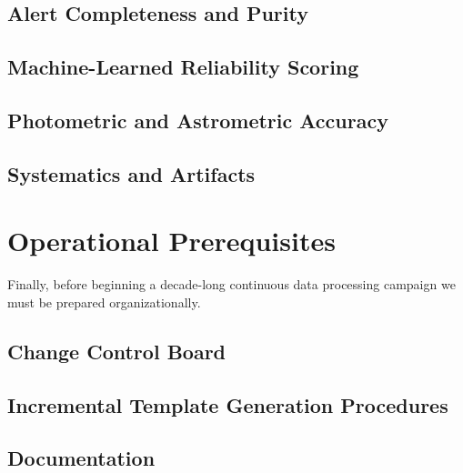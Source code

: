 \documentclass[OPS,authoryear,toc]{lsstdoc}
\begin{document}

\subsection{Alert Completeness and Purity}


\subsection{Machine-Learned Reliability Scoring}

\subsection{Photometric and Astrometric Accuracy}


\subsection{Systematics and Artifacts}

\section{Operational Prerequisites}

Finally, before beginning a decade-long continuous data processing campaign we must be prepared organizationally.

\subsection{}

\subsection{Change Control Board}

\subsection{Incremental Template Generation Procedures}

\subsection{Documentation}
\end{document}
